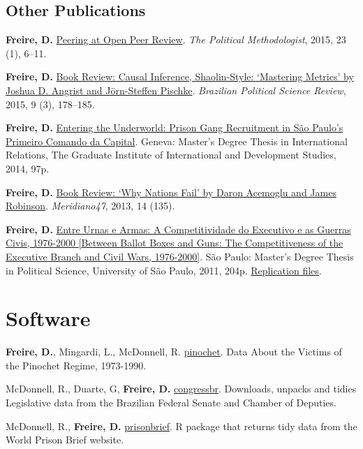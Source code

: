 \documentclass[a4paper]{article}
\renewenvironment{itemize}{
	\begin{list}{}{
			\setlength{\leftmargin}{1.5em}
		}
		}{
	\end{list}
}
\begin{document}
	\subsection*{Other Publications}

	\begin{itemize}
		\item \textbf{Freire, D.} \href{https://thepoliticalmethodologist.files.wordpress.com/2016/02/tpm_v23_n1.pdf}{Peering at Open Peer Review}. \textit{The Political Methodologist}, 2015, 23 (1), 6--11.
		\item \textbf{Freire, D.} \href{http://www.scielo.br/readcube/epdf.php?doi=10.1590/1981-38212015000300026&pid=S1981-38212015000300178&pdf_path=bpsr/v9n3/1981-3821-bpsr-9-3-0178.pdf&lang=en}{Book Review: Causal Inference, Shaolin-Style: `Mastering Metrics' by Joshua D. Angrist and J\"{o}rn-Steffen Pischke}. \textit{Brazilian Political Science Review}, 2015, 9 (3), 178--185.
		\item \textbf{Freire, D.} \href{http://dx.doi.org/10.6084/m9.figshare.1209203}{Entering the Underworld: Prison Gang Recruitment in S\~{a}o Paulo's Primeiro Comando da Capital}. Geneva: Master's Degree Thesis in International Relations, The Graduate Institute of International and Development Studies, 2014, 97p.
		\item \textbf{Freire, D.} \href{http://seer.bce.unb.br/index.php/MED/article/view/7505/6497}{Book Review: `Why Nations Fail' by Daron Acemoglu and James Robinson}. \textit{Meridiano47}, 2013, 14 (135).
		\item \textbf{Freire, D.} \href{http://dx.doi.org/10.6084/m9.figshare.963082}{Entre Urnas e Armas: A Competitividade do Executivo e as Guerras Civis, 1976-2000 {[}Between Ballot Boxes and Guns: The Competitiveness of the Executive Branch and Civil Wars, 1976-2000{]}}. S\~{a}o Paulo: Master's Degree Thesis in Political Science, University of S\~{a}o Paulo, 2011, 204p. \href{http://dx.doi.org/10.6084/m9.figshare.963183}{Replication files}.
	\end{itemize}

	\section*{Software}

	\begin{itemize}
		\item \textbf{Freire, D.}, Mingardi, L., McDonnell, R. \href{https://cran.r-project.org/package=pinochet}{pinochet}. Data About the Victims of the Pinochet Regime, 1973-1990.
		\item McDonnell, R., Duarte, G, \textbf{Freire, D.} \href{https://cran.r-project.org/package=congressbr}{congressbr}. Downloads, unpacks and tidies Legislative data from the Brazilian Federal Senate and Chamber of Deputies.
		\item McDonnell, R., \textbf{Freire, D.} \href{http://danilofreire.github.io/prisonbrief/}{prisonbrief}. R package that returns tidy data from the World Prison Brief website. 
	\end{itemize}
\end{document}
